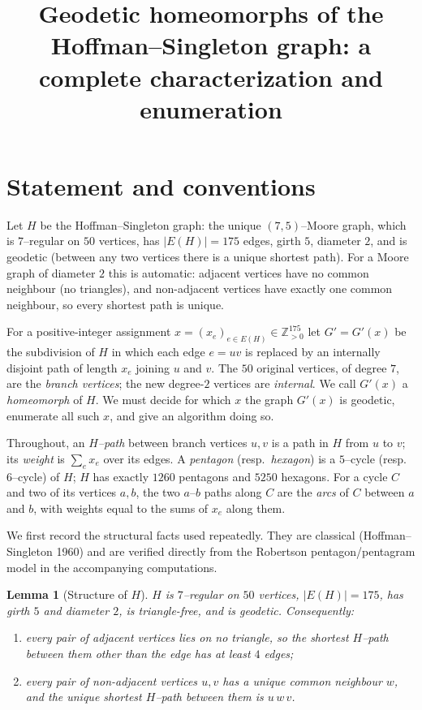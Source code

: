 \documentclass{amsart}
\newtheorem{lemma}{Lemma}
\theoremstyle{definition}
\begin{document}
\title{Geodetic homeomorphs of the Hoffman--Singleton graph: a complete
characterization and enumeration}
\maketitle

\section{Statement and conventions}

Let $H$ be the Hoffman--Singleton graph: the unique $(7,5)$--Moore graph, which
is $7$--regular on $50$ vertices, has $|E(H)|=175$ edges, girth $5$, diameter
$2$, and is geodetic (between any two vertices there is a unique shortest path).
For a Moore graph of diameter $2$ this is automatic: adjacent vertices have no
common neighbour (no triangles), and non-adjacent vertices have exactly one
common neighbour, so every shortest path is unique.

For a positive-integer assignment $x=(x_e)_{e\in E(H)}\in\mathbb Z_{>0}^{175}$
let $G'=G'(x)$ be the subdivision of $H$ in which each edge $e=uv$ is replaced
by an internally disjoint path of length $x_e$ joining $u$ and $v$. The $50$
original vertices, of degree $7$, are the \emph{branch vertices}; the new
degree-$2$ vertices are \emph{internal}. We call $G'(x)$ a \emph{homeomorph} of
$H$. We must decide for which $x$ the graph $G'(x)$ is geodetic, enumerate all
such $x$, and give an algorithm doing so.

Throughout, an \emph{$H$--path} between branch vertices $u,v$ is a path in $H$
from $u$ to $v$; its \emph{weight} is $\sum_{e}x_e$ over its edges. A
\emph{pentagon} (resp.\ \emph{hexagon}) is a $5$--cycle (resp.\ $6$--cycle) of
$H$; $H$ has exactly $1260$ pentagons and $5250$ hexagons. For a cycle $C$ and
two of its vertices $a,b$, the two $a$--$b$ paths along $C$ are the \emph{arcs}
of $C$ between $a$ and $b$, with weights equal to the sums of $x_e$ along them.

We first record the structural facts used repeatedly. They are classical
(Hoffman--Singleton 1960) and are verified directly from the Robertson
pentagon/pentagram model in the accompanying computations.

\begin{lemma}[Structure of $H$]\label{lem:struct}
$H$ is $7$--regular on $50$ vertices, $|E(H)|=175$, has girth $5$ and diameter
$2$, is triangle-free, and is geodetic. Consequently:
\begin{enumerate}
\item every pair of adjacent vertices lies on no triangle, so the shortest
$H$--path between them other than the edge has at least $4$ edges;
\item every pair of non-adjacent vertices $u,v$ has a unique common neighbour
$w$, and the unique shortest $H$--path between them is $u\,w\,v$.
\end{enumerate}
\end{lemma}
\end{document}
